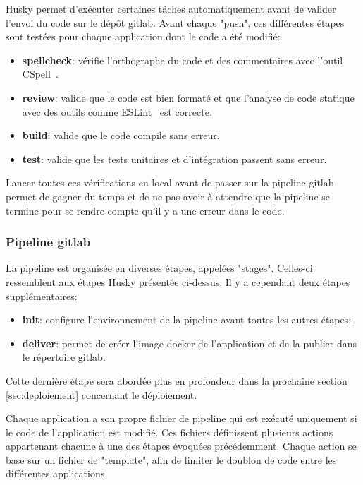 Husky permet d'exécuter certaines tâches automatiquement avant de valider l'envoi du code sur le dépôt \gls{gitlab}. Avant chaque "push", ces différentes étapes sont testées pour chaque application dont le code a été modifié:

\begin{itemize}
  \item \textbf{spellcheck}: vérifie l'orthographe du code et des commentaires avec l'outil CSpell~\cite{cspell}.
  \item \textbf{review}: valide que le code est bien formaté et que l'analyse de code statique avec des outils comme ESLint~\cite{eslint} est correcte.
  \item \textbf{build}: valide que le code compile sans erreur.
  \item \textbf{test}: valide que les tests unitaires et d'intégration passent sans erreur.
\end{itemize}

Lancer toutes ces vérifications en local avant de passer sur la pipeline \gls{gitlab} permet de gagner du temps et de ne pas avoir à attendre que la pipeline se termine pour se rendre compte qu'il y a une erreur dans le code.

\subsubsection{Pipeline \gls{gitlab}}

La pipeline est organisée en diverses étapes, appelées "stages". Celles-ci ressemblent aux étapes Husky présentée ci-dessus. Il y a cependant deux étapes supplémentaires:

\begin{itemize}
  \item \textbf{init}: configure l'environnement de la pipeline avant toutes les autres étapes;
  \item \textbf{deliver}: permet de créer l'image \gls{docker} de l'application et de la publier dans le répertoire \gls{gitlab}.
\end{itemize}

Cette dernière étape sera abordée plus en profondeur dans la prochaine section \ref{sec:deploiement} concernant le déploiement.

Chaque application a son propre fichier de pipeline qui est exécuté uniquement si le code de l'application est modifié. Ces fichiers définissent plusieurs actions appartenant chacune à une des étapes évoquées précédemment. Chaque action se base sur un fichier de "template", afin de limiter le doublon de code entre les différentes applications.

